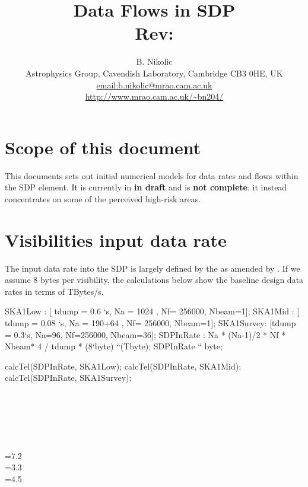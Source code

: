 \documentclass[useAMS,usenatbib,referee]{article}
\title{Data Flows in SDP\\
  Rev: }
\author{B. Nikolic\\
  Astrophysics Group, Cavendish Laboratory, Cambridge CB3 0HE, UK
  \\\url{email:b.nikolic@mrao.cam.ac.uk}
 \\\url{http://www.mrao.cam.ac.uk/~bn204/}}
\begin{document}
\maketitle

\tableofcontents

\section{Scope of this document}

This documents sets out initial numerical models for data rates and
flows within the SDP element. It is currently in {\bf in draft} and is
{\bf not complete}: it instead concentrates on some of the perceived
high-risk areas. 

\section{Visibilities input data rate}

The input data rate into the SDP is largely defined by the
\cite{DewdneyDD001-1} as amended by \cite{McCoolDD003}.  If we assume
8 bytes per visibility, the calculations below show the baseline
design data rates in terms of TBytes/s. 

\begin{maxima}
SKA1Low : [ tdump = 0.6 `s, Na = 1024 , Nf= 256000, Nbeam=1];
SKA1Mid : [ tdump = 0.08 `s, Na = 190+64 , Nf= 256000, Nbeam=1];
SKA1Survey: [tdump = 0.3`s, Na=96, Nf=256000, Nbeam=36];
SDPInRate : Na * (Na-1)/2 * Nf * Nbeam* 4 / tdump * (8`byte) ``(Tbyte);
SDPInRate `` byte;

calcTel(SDPInRate, SKA1Low);
calcTel(SDPInRate, SKA1Mid);
calcTel(SDPInRate, SKA1Survey);

\maximaoutput*
\m  \left[ t_{\rm dump}=0.6\;\mathrm{s} , N_{\rm a}=1024 , N_{\rm f}=256000 , N_{\rm beam}=1 \right] \\
\m  \left[ t_{\rm dump}=0.08\;\mathrm{s} , N_{\rm a}=254 , N_{\rm f}=256000 , N_{\rm beam}=1 \right] \\
\m  \left[ t_{\rm dump}=0.3\;\mathrm{s} , N_{\rm a}=96 , N_{\rm f}=256000 , N_{\rm beam}=36 \right] \\
\; \\
\; \\
\m  {}=7.2 \\
\m  {}=3.3 \\
\m  {}=4.5 \\
\end{maxima}
\end{document}
